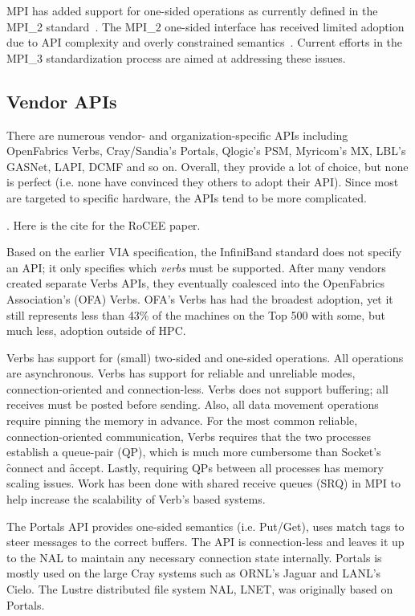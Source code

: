 MPI has added support for one-sided operations as currently defined
in the MPI\_2 standard~\cite{geist96:_mpi2_lyon}. The MPI\_2 one-sided
interface has received limited adoption due to API complexity and
overly constrained semantics~\cite{bonachea-upc-mpi2}. Current efforts
in the MPI\_3 standardization process are aimed at addressing these
issues. 


\subsection{Vendor APIs} There are numerous vendor- and
organization-specific APIs including OpenFabrics
Verbs\cite{ofa-verbs}, Cray/Sandia's Portals\cite{portals}, Qlogic's
PSM\cite{psm}, Myricom's MX\cite{mx}, LBL's GASNet\cite{gasnet},
LAPI\cite{lapi_a_1998}, DCMF\cite{Kumar:2008:DCM:1375527.1375544} and
so on.  Overall, they provide a lot of choice, but none is perfect
(i.e. none have convinced they others to adopt their API).  Since most
are targeted to specific hardware, the APIs tend to be more
complicated.

.
Here is the cite for the RoCEE paper\cite{RoCEE}.

Based on the earlier VIA specification\cite{via}, the InfiniBand standard does not specify
an API; it only specifies which \emph{verbs} must be supported. After many vendors created
separate Verbs APIs, they eventually coalesced into the OpenFabrics Association's (OFA)
Verbs. OFA's Verbs has had the broadest adoption, yet it still represents less than 43\%
of the machines on the Top 500\cite{top500} with some, but much less, adoption outside of
HPC.

Verbs has support for (small) two-sided and one-sided operations. All operations are
asynchronous. Verbs has support for reliable and unreliable modes, connection-oriented
and connection-less. Verbs does not support buffering; all receives must be posted before
sending. Also, all data movement operations require pinning the memory in advance. For the
most common reliable, connection-oriented communication, Verbs requires that the two
processes establish a queue-pair (QP), which is much more cumbersome than Socket's
\f{connect} and \f{accept}. Lastly, requiring QPs between all processes has memory scaling
issues. Work has been done with shared receive queues (SRQ) in MPI\cite{srq} to help
increase the scalability of Verb's based systems.

The Portals API provides one-sided semantics (i.e.  Put/Get), uses match tags to steer
messages to the correct buffers. The API is connection-less and leaves it up to the NAL to
maintain any necessary connection state internally. Portals is mostly used on the large
Cray systems such as ORNL's Jaguar\cite{jaguar_cug_2010} and LANL's Cielo\cite{cielo}.  The
Lustre distributed file system NAL, LNET, was originally based on Portals\cite{lnet}.


